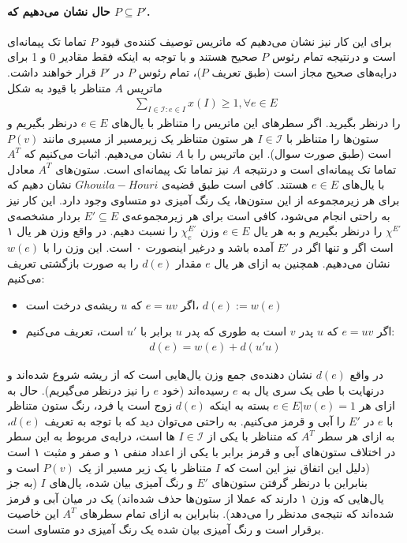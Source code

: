 \documentclass[a4paper,12pt]{article}
\begin{document}
\paragraph{حال نشان می‌دهیم که $P \subseteq P'$.}
برای این کار نیز نشان می‌دهیم که ماتریس توصیف کننده‌ی قیود $P$ تماما تک پیمانه‌ای است و درنتیجه تمام رئوس $P$ صحیح هستند و با توجه به اینکه فقط مقادیر 0 و 1 برای درایه‌های صحیح مجاز است (طبق تعریف $P$)، تمام رئوس $P$ در $P'$ قرار خواهند داشت.
ماتریس $A$ متناظر با قیود به شکل
\begin{align*}
	\sum_{I \in \mathcal{I} : e \in I} x(I) \geq 1, \forall e \in E
\end{align*}
را درنظر بگیرید.
اگر سطر‌های این ماتریس را متناظر با یال‌های 
$e \in E$
درنظر بگیریم و ستون‌ها را متناظر با
$I \in \mathcal{I} $
هر ستون متناظر یک زیرمسیر از مسیری مانند $P(v)$ است (طبق صورت سوال). این ماتریس را با $A$ نشان می‌دهیم. اثبات می‌کنیم که $A^T$ تماما تک پیمانه‌ای است و درنتیجه $A$ نیز تماما تک پیمانه‌ای است. 
\newline
ستون‌های $A^T$ معادل با یال‌های $e \in E$ هستند. کافی است طبق قضیه‌ی
$Ghouila-Houri$
نشان دهیم که برای هر زیرمجموعه از این ستون‌ها، یک رنگ آمیزی دو متساوی وجود دارد. این کار نیز به راحتی انجام می‌شود، کافی است برای هر زیرمجموعه‌ی 
$E' \subseteq E$
بردار مشخصه‌ی
$\chi^{E'}$
را درنظر بگیریم و به هر یال $e \in E$ وزن
$\chi^{E'}_{e}$
را نسبت دهیم. در واقع وزن هر یال ۱ است اگر و تنها اگر در $E'$ آمده باشد و درغیر اینصورت ۰ است.  این وزن را با $w(e)$ نشان می‌دهیم. همچنین به ازای هر یال $e$ مقدار $d(e)$ را به صورت بازگشتی تعریف می‌کنیم:
\begin{itemize}
	\item اگر $e=uv$ که $u$ ریشه‌ی درخت است، $d(e):=w(e)$
	\item اگر $e=uv$ که $u$ پدر $v$ است به طوری که پدر $u$ برابر با $u'$ است، تعریف می‌کنیم:
	\begin{align*}
		d(e) = w(e) + d(u'u)
	\end{align*}
\end{itemize}
در واقع $d(e)$ نشان دهنده‌ی جمع وزن‌ یال‌هایی است که از ریشه شروع شده‌اند و درنهایت با طی یک سری یال به $e$ رسیده‌اند  (خود $e$ را نیز درنظر می‌گیریم).
حال به ازای هر 
$e \in E | w(e) = 1$
بسته به اینکه
$d(e)$
زوج است یا فرد، رنگ ستون متناظر با $e$ در $E'$ را آبی و قرمز می‌کنیم. به راحتی می‌توان دید که با توجه به تعریف $d(e)$، به ازای هر سطر $A^T$  که متناظر با یکی از $I \in \mathcal{I}$ ها است، درایه‌ی مربوط به این سطر در اختلاف ستون‌های آبی و قرمز برابر با یکی از اعداد منفی ۱ و صفر و مثبت ۱ است (دلیل این اتفاق نیز این است که $I$ متناظر با یک زیر مسیر از یک $P(v)$ است و بنابراین با درنظر گرفتن ستون‌های $E'$ و رنگ آمیزی بیان شده، یال‌های $I$ (به جز یال‌هایی که وزن ۱ دارند که عملا از ستون‌ها حذف شده‌اند) یک در میان آبی و قرمز شده‌اند که نتیجه‌ی مدنظر را می‌دهد). بنابراین به ازای تمام سطر‌های $A^T$ این خاصیت برقرار است و رنگ آمیزی بیان شده یک رنگ آمیزی دو متساوی است. 
\end{document}

